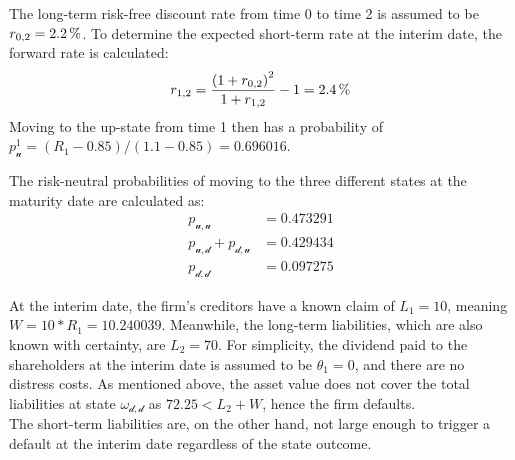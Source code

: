 \documentclass[main.tex]{subfiles}
\begin{document}
        The long-term risk-free discount rate from time 0 to time 2 is assumed to be $r_{0,2}=\pct{0.022}$.
        To determine the expected short-term rate at the interim date, the forward rate is calculated:
        \begin{equation*}
            r_{1,2} =
                \frac{
                    \left(\num{1} + r_{0,2}\right)^{2}
                }{
                    \num{1} + r_{1,2}
                }
            - \num{1}
            = \pct{0.024}
        \end{equation*}
        Moving to the up-state from time 1 then has a probability of
        $p^1_\mathscr{u}=(R_1-\num{0.85})/(\num{1.1}-\num{0.85}) = \num{0.696016}$.
        
        The risk-neutral probabilities of moving to the three different states at the maturity date are calculated as:
        \begin{align*}
            p_{\mathscr{u},\mathscr{u}}
            &=
            \num{0.473291}
            \\
            p_{\mathscr{u},\mathscr{d}} +
            p_{\mathscr{d},\mathscr{u}}
            &=
            \num{0.429434}
            \\
            p_{\mathscr{d},\mathscr{d}}
            &=
            \num{0.097275}
        \end{align*}

        At the interim date, the firm's creditors have a known claim of $L_{1} = \num{10}$,
        meaning $W=\num{10}*R_1=\num{10.240039}$.
        Meanwhile, the long-term liabilities, which are also known with certainty, are $L_{2} = \num{70}$.
        For simplicity, the dividend paid to the shareholders at the interim date is assumed to be $\theta_1 = 0$, and there are no distress costs.
        As mentioned above, the asset value does not cover the total liabilities at state $\omega_{\mathscr{d},\mathscr{d}}$ as $\num{72.25} < L_{2} + W$,
        hence the firm defaults.
        \\
        The short-term liabilities are, on the other hand, not large enough to trigger a default at the interim date
        regardless of the state outcome.
\end{document}
